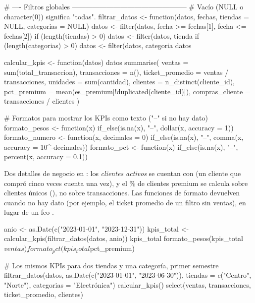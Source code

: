\begin{rcode}
# ---- Filtros globales --------------------------------------------------
# Vacío (NULL o character(0)) significa "todas".
filtrar_datos <- function(datos, fechas, tiendas = NULL,
                          categorias = NULL) {
  datos <- filter(datos, fecha >= fechas[1], fecha <= fechas[2])
  if (length(tiendas) > 0) {
    datos <- filter(datos, tienda %
  }
  if (length(categorias) > 0) {
    datos <- filter(datos, categoria %
  }
  datos
}

calcular_kpis <- function(datos) {
  datos %
    summarise(
      ventas          = sum(total_transaccion),
      transacciones   = n(),
      ticket_promedio = ventas / transacciones,
      unidades        = sum(cantidad),
      clientes        = n_distinct(cliente_id),
      pct_premium     = mean(es_premium[!duplicated(cliente_id)]),
      compras_cliente = transacciones / clientes
    )
}

# Formatos para mostrar los KPIs como texto ("--" si no hay dato)
formato_pesos <- function(x) {
  if_else(is.na(x), "--", dollar(x, accuracy = 1))
}
formato_numero <- function(x, decimales = 0) {
  if_else(is.na(x), "--", comma(x, accuracy = 10^-decimales))
}
formato_pct <- function(x) {
  if_else(is.na(x), "--", percent(x, accuracy = 0.1))
}
\end{rcode}

Dos detalles de negocio en : los \emph{clientes
activos} se cuentan con  (un cliente que compró cinco
veces cuenta una vez), y el \% de clientes premium se calcula sobre
clientes únicos (), no sobre
transacciones. Las funciones de formato devuelven  cuando no
hay dato (por ejemplo, el ticket promedio de un filtro sin ventas), en lugar
de un feo .

\begin{rcode}
anio <- as.Date(c("2023-01-01", "2023-12-31"))
kpis_total <- calcular_kpis(filtrar_datos(datos, anio))
kpis_total %
formato_pesos(kpis_total$ventas)
formato_pct(kpis_total$pct_premium)

# Los mismos KPIs para dos tiendas y una categoría, primer semestre
filtrar_datos(datos, as.Date(c("2023-01-01", "2023-06-30")),
              tiendas = c("Centro", "Norte"),
              categorias = "Electrónica") %
  calcular_kpis() %
  select(ventas, transacciones, ticket_promedio, clientes)
\end{rcode}

